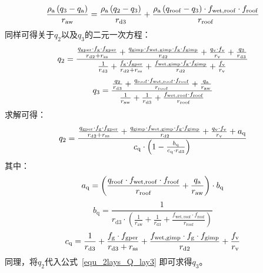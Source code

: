 %
\begin{equation}
  \frac{\rho _{\rm a} \left( q_{3} - q_{\rm a}\right)}{r_{\mathrm{aw}}} = \frac{\rho _{\rm a} \left( q_{2} - q_{3}\right)}{r_{\mathrm{d3}}} + \frac{\rho _{\rm a} \left( q_{\mathrm{roof}}-q_{3}\right) \cdot f_{\mathrm{wet,roof}} \cdot f_{\mathrm{roof}}}{r_{\mathrm{roof}}}
\end{equation}
同样可得关于$q_{2}$以及$q_{3}$的二元一次方程：
\begin{equation}
  q_{2} = \\
  \frac{\frac{q_{\mathrm{gper}} \cdot f_{\mathrm{g}} \cdot f_{\mathrm{gper}}}{r_{\mathrm{d2}} + r_{\mathrm{ss}}} + \frac{q_{\mathrm{gimp}} \cdot f_{\mathrm{wet,gimp}} \cdot f_{\mathrm{g}} \cdot f_{\mathrm{gimp}}}{r_{\mathrm{d2}}} + \frac{q_{\mathrm{v}} \cdot f_{\rm v}}{r_{\mathrm{v}}} + \frac{q_{\mathrm{3}}}{r_{\mathrm{d3}}}}{\frac{1}{r_{\mathrm{d3}}} + \frac{f_{\mathrm{g}} \cdot f_{\mathrm{gper}}}{r_{\mathrm{d2}} + r_{\mathrm{ss}}} + \frac{f_{\mathrm{wet,gimp}} \cdot f_{\mathrm{g}} \cdot f_{\mathrm{gimp}}}{r_{\mathrm{d2}}}+\frac{f_{\rm v}}{r_{\mathrm{v}}}}
\end{equation}
%
\begin{equation}\label{equ_2lays_Q_lay3}
  q_{3} = \frac{\frac{q_{2}}{r_{\mathrm{d3}}} + \frac{q_{\mathrm{roof}} \cdot f_{\mathrm{wet,roof}} \cdot f_{\mathrm{roof}}}{r_{\mathrm{roof}}} + \frac{q_{\rm a}}{r_{\mathrm{aw}}}}{\frac{1}{r_{\mathrm{aw}}} + \frac{1}{r_{\mathrm{d3}}} + \frac{f_{\mathrm{wet,roof}} \cdot f_{\mathrm{roof}}}{r_{\mathrm{roof}}}}
\end{equation}
求解可得：
\begin{equation}
  q_{2} = \\
  \frac{\frac{q_{\mathrm{gper}} \cdot f_{\mathrm{g}} \cdot f_{\mathrm{gper}}}{r_{\mathrm{d2}}+r_{\mathrm{ss}}} + \frac{q_{\mathrm{gimp}} \cdot f_{\mathrm{wet,gimp}} \cdot f_{\mathrm{g}} \cdot f_{\mathrm{gimp}}}{r_{\mathrm{d2}} } + \frac{q_{\mathrm{v}} \cdot f_{\rm v}}{r_{\mathrm{v}}} + a_{\mathrm{q}}}{c_{\mathrm{q}} \cdot \left( 1 - \frac{b_{\mathrm{q}}}{c_{\mathrm{q}} \cdot r_{\mathrm{d3}}}\right)}
\end{equation}
%
其中：
\begin{equation}
  a_{\mathrm{q}}= \left(\frac{q_{\mathrm{roof}} \cdot f_{\mathrm{wet,roof}} \cdot f_{\mathrm{roof}}}{r_{\mathrm{roof}}} + \frac{q_{\rm a}}{r_{\mathrm{aw}}}\right) \cdot b_{\mathrm{q}}
\end{equation}
%
\begin{equation}
  b_{\mathrm{q}} = \frac{1}{r_{\mathrm{d3}} \cdot \left( \frac{1}{r_{\mathrm{aw}}} + \frac{1}{r_{\mathrm{d3}}} + \frac{f_{\mathrm{wet,roof}} \cdot f_{\mathrm{roof}}}{r_{\mathrm{roof}}} \right)}
\end{equation}
%
\begin{equation}
  c_{\mathrm{q}} = \frac{1}{r_{\mathrm{d3}}}+\frac{f_{\rm g} \cdot f_{\mathrm{gper}}}{r_{\mathrm{d3}}+r_{\mathrm{ss}}} + \frac{f_{\mathrm{wet,gimp}} \cdot f_{\rm g} \cdot f_{\mathrm{gimp}}}{r_{\mathrm{d2}}} + \frac{f_{\rm v}}{r_{\mathrm{v}}}
\end{equation}
同理，将$q_{\mathrm{2}}$代入公式~\eqref{equ_2lays_Q_lay3} 即可求得$q_{3}$。

